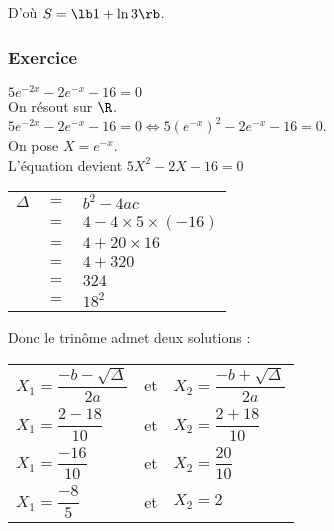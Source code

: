 D'où $ S = \lb 1 + \ln 3 \rb $. 


\newpage

\subsubsection{Exercice }

$5e^{-2x} - 2e^{-x} - 16 = 0$ \\

On résout sur $\R$. \\

$5e^{-2x} - 2e^{-x} - 16 = 0 \Longleftrightarrow 5\left(e^{-x}\right)^2 - 2e^{-x} - 16 = 0$. \\

On pose $X = e^{-x}$. \\

L'équation devient $5X^2 - 2X - 16 = 0$ \\

\begin{tabular}{lll}
$\Delta$ & $=$ & $b^2 - 4ac$ \\
& $=$ & $4 - 4\times 5 \times \left(-16\right)$ \\
& $=$ & $4 + 20 \times 16$ \\
& $=$ & $4 + 320$ \\
& $=$ & $324$ \\
& $=$ & $18^2$ \\
\end{tabular}

\vspace*{.3cm}

Donc le trinôme admet deux solutions : \\

\begin{tabular}{lll}
$X_1 = \dfrac{-b - \sqrt{\Delta}}{2a}$ & et & $X_2 = \dfrac{-b + \sqrt{\Delta}}{2a}$ \vspace*{.3cm} \\
$X_1 = \dfrac{2 - 18}{10}$ & et & $X_2 = \dfrac{2 + 18}{10}$ \vspace*{.3cm} \\
$X_1 = \dfrac{-16}{10}$ & et & $X_2 = \dfrac{20}{10}$ \vspace*{.3cm} \\
$X_1 = \dfrac{-8}{5}$ & et & $X_2 = 2$ \\
\end{tabular}

\vspace*{.3cm}

